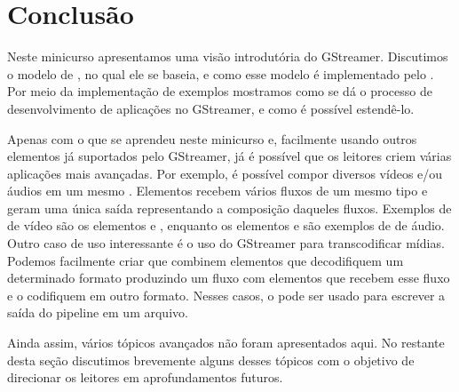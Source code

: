 \section{Conclusão}
\label{sec:conclusao}
Neste minicurso apresentamos uma visão introdutória do 
GStreamer.  Discutimos o modelo de , no qual ele se baseia, e como
esse modelo é implementado pelo .  Por meio da implementação de
exemplos mostramos como se dá o processo de desenvolvimento de aplicações no
GStreamer, e como é possível estendê-lo. 

Apenas com o que se aprendeu neste minicurso e, facilmente usando outros
elementos já suportados pelo GStreamer, já é possível que os leitores criem
várias aplicações mais avançadas.  Por exemplo, é possível compor diversos
vídeos e/ou áudios em um mesmo .  Elementos 
recebem vários fluxos de um mesmo tipo e geram uma única saída representando a
composição daqueles fluxos. Exemplos de  de vídeo são os elementos
 e , enquanto os elementos  e
 são exemplos de  de áudio.  Outro caso de uso
interessante é o uso do GStreamer para transcodificar mídias.  Podemos
facilmente criar  que combinem elementos que decodifiquem um
determinado formato produzindo um fluxo  com elementos que recebem esse
fluxo  e o codifiquem em outro formato.  Nesses casos, o 
 pode ser usado para escrever a saída do pipeline em um arquivo.

Ainda assim, vários tópicos avançados não foram apresentados aqui.  No restante
desta seção discutimos brevemente alguns desses tópicos com o objetivo de
direcionar os leitores em aprofundamentos futuros.

